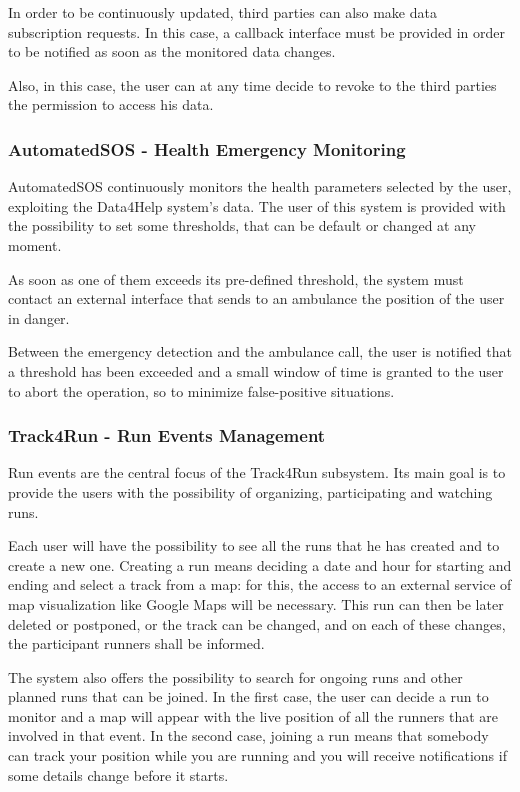 In order to be continuously updated, third parties can also make data subscription requests. In this case, a callback interface must be provided in order to be notified as soon as the monitored data changes.

Also, in this case, the user can at any time decide to revoke to the third parties the permission to access his data.

\subsubsection{AutomatedSOS - Health Emergency Monitoring}
AutomatedSOS continuously monitors the health parameters selected by the user, exploiting the Data4Help system's data. The user of this system is provided with the possibility to set some thresholds, that can be default or changed at any moment.

As soon as one of them exceeds its pre-defined threshold, the system must contact an external interface that sends to an ambulance the position of the user in danger.

Between the emergency detection and the ambulance call, the user is notified that a threshold has been exceeded and a small window of time is granted to the user to abort the operation, so to minimize false-positive situations.

\subsubsection{Track4Run - Run Events Management}
Run events are the central focus of the Track4Run subsystem. Its main goal is to provide the users with the possibility of organizing, participating and watching runs.

Each user will have the possibility to see all the runs that he has created and to create a new one. Creating a run means deciding a date and hour for starting and ending and select a track from a map: for this, the access to an external service of map visualization like Google Maps will be necessary. This run can then be later deleted or postponed, or the track can be changed, and on each of these changes, the participant runners shall be informed.

The system also offers the possibility to search for ongoing runs and other planned runs that can be joined. In the first case, the user can decide a run to monitor and a map will appear with the live position of all the runners that are involved in that event. In the second case, joining a run means that somebody can track your position while you are running and you will receive notifications if some details change before it starts.

